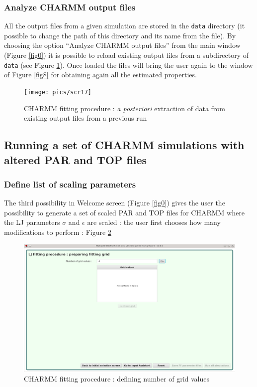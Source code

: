 \documentclass[12pt,a4paper]{article}
\begin{document}
\subsubsection{Analyze CHARMM output files}

All the output files from a given simulation are stored in the \texttt{data} directory (it possible 
to 
change the path of this directory and its name from the \texttt{} file).
By choosing the option ``Analyze CHARMM output files'' from the main window (Figure \ref{fig0}) it 
is 
possible to reload existing output files from a subdirectory of \texttt{data} (see Figure 
\ref{fig8b}). Once loaded the 
files will bring the user again to the window of Figure \ref{fig8} for obtaining again all the 
estimated properties.

\begin{figure}[h!]
\centering
\texttt{[image: pics/scr17]}
\caption{CHARMM fitting procedure : \textit{a posteriori} extraction of data from existing output 
files from a previous run}
\label{fig8b}
\end{figure}

\clearpage

\subsection{Running a set of CHARMM simulations with altered PAR and TOP files}

\subsubsection{Define list of scaling parameters}

The third possibility in Welcome screen (Figure \ref{fig0}) gives the user the possibility to 
generate a set of scaled PAR and TOP files for CHARMM where the LJ parameters $\sigma$ and 
$\epsilon$ are scaled : the user first chooses how many modifications to perform : Figure 
\ref{fig9}\\

\begin{figure}[h!]
\centering
\includegraphics[width=0.9\linewidth]{pics/scr9}
\caption{CHARMM fitting procedure : defining number of grid values}
\label{fig9}
\end{figure}
\end{document}
